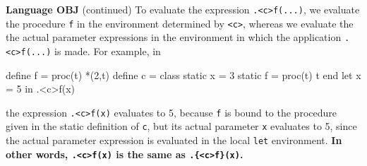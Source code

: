 \begin{minipage}[t]{\sw}
\slidenumber
\LARGE
{\bf Language OBJ} (continued)\exx
To evaluate the expression \verb'.<c>f(...)',
we evaluate the procedure \verb'f'
in the environment determined by \verb'<c>',
whereas we evaluate the the actual parameter expressions
in the environment in which the application \verb'.<c>f(...)' is made.
For example, in
\begin{qv}
define f = proc(t) *(2,t)
define c =
  class
    static x = 3
    static f = proc(t) t
  end
let
  x = 5
in
  .<c>f(x)
\end{qv}
the expression \verb'.<c>f(x)' evaluates to 5,
because \verb'f' is bound to the procedure given
in the static definition of \verb'c',
but its actual parameter \verb'x' evaluates to 5,
since the actual parameter expression is evaluated
in the local \verb'let' environment.
{\bf In other words, \verb'.<c>f(x)' is the same
as \verb'.{<c>f}(x)'.}
\end{minipage}
